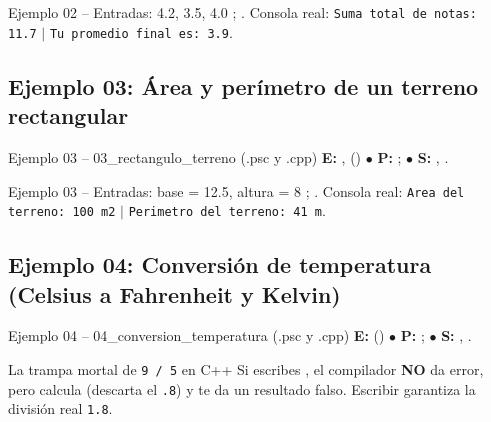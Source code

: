 \documentclass[11pt,letterpaper]{article}
\begin{document}
\begin{pruebaescritorio}{Ejemplo 02 -- Entradas: 4.2, 3.5, 4.0}
; . Consola real: \texttt{Suma total de notas: 11.7} $\mid$ \texttt{Tu promedio final es: 3.9}.
\end{pruebaescritorio}

\subsection{Ejemplo 03: Área y perímetro de un terreno rectangular}
\begin{analisis}{Ejemplo 03 -- 03\_rectangulo\_terreno (.psc y .cpp)}
\textbf{E:} ,  () \quad $\bullet$ \textbf{P:} ;  \quad $\bullet$ \textbf{S:} , .
\end{analisis}




\begin{pruebaescritorio}{Ejemplo 03 -- Entradas: base = 12.5, altura = 8}
; . Consola real: \texttt{Area del terreno: 100 m2} $\mid$ \texttt{Perimetro del terreno: 41 m}.
\end{pruebaescritorio}

\subsection{Ejemplo 04: Conversión de temperatura (Celsius a Fahrenheit y Kelvin)}
\begin{analisis}{Ejemplo 04 -- 04\_conversion\_temperatura (.psc y .cpp)}
\textbf{E:}  () \quad $\bullet$ \textbf{P:} ;  \quad $\bullet$ \textbf{S:} , .
\end{analisis}

\begin{peligro}{La trampa mortal de \texttt{9 / 5} en C++}
Si escribes , el compilador \textbf{NO} da error, pero calcula  (descarta el \texttt{.8}) y te da un resultado falso. Escribir  garantiza la división real \texttt{1.8}.
\end{peligro}
\end{document}
